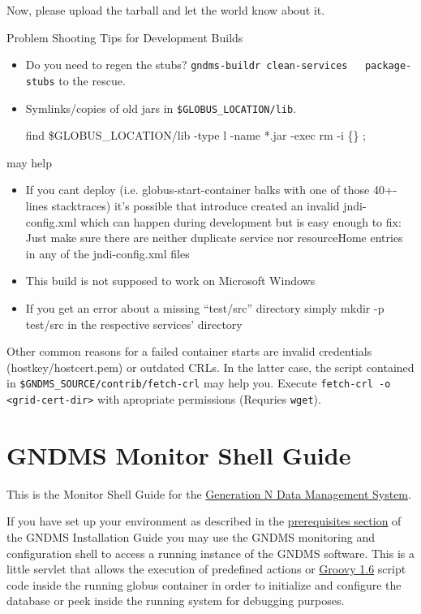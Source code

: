 \documentclass{article}
\begin{document}
Now, please upload the tarball and let the world know about it.

Problem Shooting Tips for Development Builds

\begin{itemize}
\item
  Do you need to regen the stubs?
  \verb!gndms-buildr clean-services   package-stubs! to the rescue.

\item
  Symlinks/copies of old jars in \verb!$GLOBUS_LOCATION/lib!.

  find \$GLOBUS\_LOCATION/lib -type l -name *.jar -exec rm -i \{\} ;

\end{itemize}
may help

\begin{itemize}
\item
  If you cant deploy (i.e. globus-start-container balks with one of
  those 40+-lines stacktraces) it's possible that introduce created
  an invalid jndi-config.xml which can happen during development but
  is easy enough to fix: Just make sure there are neither duplicate
  service nor resourceHome entries in any of the jndi-config.xml
  files

\item
  This build is not supposed to work on Microsoft Windows

\item
  If you get an error about a missing ``test/src'' directory simply
  mkdir -p test/src in the respective services' directory

\end{itemize}
Other common reasons for a failed container starts are invalid
credentials (hostkey/hostcert.pem) or outdated CRLs. In the latter
case, the script contained in
\verb!$GNDMS_SOURCE/contrib/fetch-crl! may help you. Execute
\verb!fetch-crl -o <grid-cert-dir>! with apropriate permissions
(Requries \verb!wget!).

\section{GNDMS Monitor Shell Guide}

This is the Monitor Shell Guide for the \href{../index.html}{Generation N Data Management System}.

If you have set up your environment as described in the
\href{/installation-guide/#prerequisites}{prerequisites section} of
the GNDMS Installation Guide you may use the GNDMS monitoring and
configuration shell to access a running instance of the GNDMS
software. This is a little servlet that allows the execution of
predefined actions or \href{http://groovy.codehaus.org}{Groovy 1.6}
script code inside the running globus container in order to
initialize and configure the database or peek inside the running
system for debugging purposes.
\end{document}
